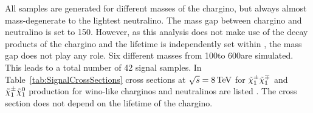 All samples are generated for different masses of the chargino, but always almost mass-degenerate to the lightest neutralino.
The mass gap between chargino and neutralino is set to 150\mev.
However, as this analysis does not make use of the decay products of the chargino and the lifetime is independently set within \geant, the mass gap does not play any role.
Six different masses from 100\gev to 600\gev are simulated.
This leads to a total number of 42 signal samples.
In Table~\ref{tab:SignalCrossSections} cross sections at $\sqrt{s}=8\,\text{Te}\kern-0.06667em\text{V}$ for $\tilde{\chi}^{\pm}_{1}\tilde{\chi}^{\mp}_{1}$ and $\tilde{\chi}^{\pm}_{1}\tilde{\chi}^{0}_{1}$ production 
for wino-like charginos and neutralinos are listed \cite{bib:SignalCrossSection_2012,bib:SignalCrossSection_2013}.
The cross section does not depend on the lifetime of the chargino.
\renewcommand{\arraystretch}{1.5}
\begin{table}[h]
\centering
\caption{Simulated signal mass points with corresponding cross sections at NLO-NLL (NLO: next-to-leading order, NLL: next-to-leading logarithmic) accuracy for wino-like charginos.}
\label{tab:SignalCrossSections}
\end{table}  

\FloatBarrier
